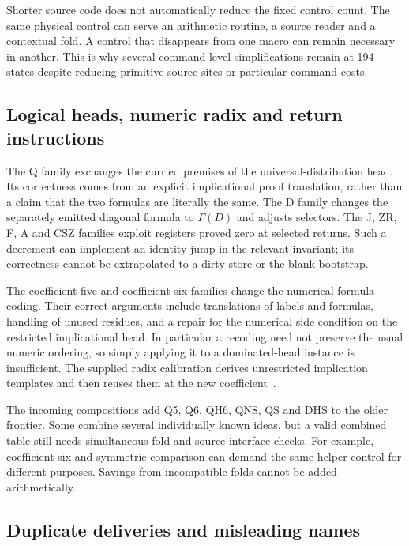 \documentclass[11pt,letterpaper]{article}
\begin{document}
Shorter source code does not automatically reduce the fixed control count.
The same physical control can serve an arithmetic routine, a source
reader and a contextual fold. A control that disappears from one macro
can remain necessary in another. This is why several command-level
simplifications remain at 194 states despite reducing primitive source
sites or particular command costs.

\subsection{Logical heads, numeric radix and return instructions}

The Q family exchanges the curried premises of the universal-distribution
head. Its correctness comes from an explicit implicational proof
translation, rather than a claim that the two formulas are literally the
same. The D family changes the separately emitted diagonal formula to
$\Gamma(D)$ and adjusts selectors. The J, ZR, F, A and CSZ families exploit
registers proved zero at selected returns. Such a decrement can implement
an identity jump in the relevant invariant; its correctness cannot be
extrapolated to a dirty store or the blank bootstrap.

The coefficient-five and coefficient-six families change the numerical
formula coding. Their correct arguments include translations of labels
and formulas, handling of unused residues, and a repair for the numerical
side condition on the restricted implicational head. In particular a
recoding need not preserve the usual numeric ordering, so simply applying
it to a dominated-head instance is insufficient. The supplied radix
calibration derives unrestricted implication templates and then reuses
them at the new coefficient~\cite{radix}.

The incoming compositions add Q5, Q6, QH6, QNS, QS and DHS to the older
frontier. Some combine several individually known ideas, but a valid
combined table still needs simultaneous fold and source-interface checks.
For example, coefficient-six and symmetric comparison can demand the
same helper control for different purposes. Savings from incompatible
folds cannot be added arithmetically.

\subsection{Duplicate deliveries and misleading names}
\end{document}
